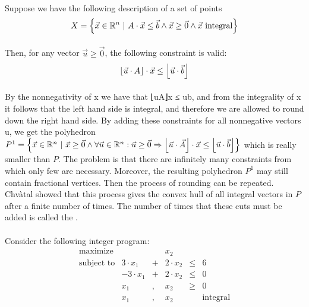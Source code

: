 {\paragraph{}
Suppose we have the following description of a set of points
\begin{equation}
X=\left\{ \vec{x}\in\mathbb{R}^n\ |\ A\cdot\vec{x}\leq\vec{b}\wedge\vec{x}\geq\vec{0}\wedge\vec{x}\mbox{ integral} \right\}
\end{equation}

\paragraph{}
Then, for any vector $\vec{u}\geq\vec{0}$, the following constraint is valid:
\begin{equation}
\left\lfloor \vec{u}\cdot A \right\rfloor\cdot\vec{x}\leq\left\lfloor \vec{u}\cdot\vec{b} \right\rfloor
\end{equation}

\paragraph{}
By the nonnegativity of x we have that ⌊uA⌋x ≤ ub, and from the integrality of x it follows that the left hand side is integral, and therefore we are allowed to round down the right hand side. By adding these constraints for all nonnegative vectors u, we get the polyhedron $P^1=\left\{ \vec{x}\in\mathbb{R}^n\ |\ \vec{x}\geq\vec{0}\wedge\forall \vec{u}\in\mathbb{R}^n:\vec{u}\geq\vec{0}\Rightarrow\left\lfloor \vec{u}\cdot\vec{A} \right\rfloor\cdot\vec{x}\leq\left\lfloor \vec{u}\cdot\vec{b} \right\rfloor \right\}$ which is really smaller than $P$. The problem is that there are infinitely many constraints from which only few are necessary. Moreover, the resulting polyhedron $P^1$ may still contain fractional vertices. Then the process of rounding can be repeated. Chv\`atal showed that this process gives the convex hull of all integral vectors in $P$ after a finite number of times. The number of times that these cuts must be added is called the .

\paragraph{}
\begin{example}
Consider the following integer program:
\begin{equation}
\begin{array}{rrcrcr}
\mbox{maximize}&&&x_2\\
\mbox{subject to}&3\cdot x_1&+&2\cdot x_2&\leq&6\\
&-3\cdot x_1&+&2\cdot x_2&\leq&0\\
&x_1&,&x_2&\geq&0\\
&x_1&,&x_2&&\mbox{integral}
\end{array}
\end{equation}


\end{example}}
